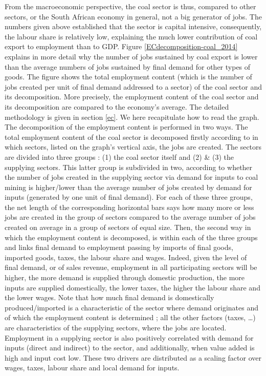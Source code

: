 \documentclass[12pt,english]{article}
\begin{document}
From the macroeconomic perspective, the coal sector is thus, compared to other sectors, or the South African economy in general, not a big generator of jobs. The numbers given above established that the sector is capital intensive, consequently, the labour share is relatively low, explaining the much lower contribution of coal export to employment than to GDP. Figure \ref{ECdecomposition-coal_2014} explains in more detail why the number of jobs sustained by coal export is lower than the average numbers of jobs sustained by final demand for other types of goods. The figure shows the total employment content (which is the number of jobs created per unit of final demand addressed to a sector) of the coal sector and its decomposition. More precisely, the employment content of the coal sector and its decomposition are compared to the economy's average. The detailed methodology is given in section \ref{ec}. We here recapitulate how to read the graph.
The decomposition of the employment content is performed in two ways. The total employment content of the coal sector is decomposed firstly according to in which sectors, listed on the graph's vertical axis, the jobs are created. The sectors are divided into three groups : (1) the coal sector itself and (2) \& (3) the supplying sectors. This latter group is subdivided in two, according to whether the number of jobs created in the supplying sector via demand for inputs to coal mining is higher/lower than the average number of jobs created by demand for inputs (generated by one unit of final demand). For each of these three groups, the net length of the corresponding horizontal bars says how many more or less jobs are created in the group of sectors compared to the average number of jobs created on average in a group of sectors of equal size. Then, the second way in which the employment content is decomposed, is within each of the three groups and links final demand to employment passing by imports of final goods, imported goods, taxes, the labour share and wages. Indeed, given the level of final demand, or of sales revenue, employment in all participating sectors will be higher, the more demand is supplied through domestic production, the more inputs are supplied domestically, the lower taxes, the higher the labour share and the lower wages. Note that how much final demand is domestically produced/imported is a characteristic of the sector where demand originates and of which the employment content is determined ; all the other factors (taxes, \ldots) are characteristics of the supplying sectors, where the jobs are located. Employment in a supplying sector is also positively correlated with demand for inputs (direct and indirect) to the sector, and additionally, when value added is high and input cost low. These two drivers are distributed as a scaling factor over wages, taxes, labour share and local demand for inputs. 
\end{document}
